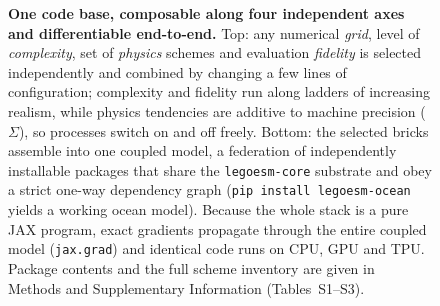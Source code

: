 \documentclass[11pt]{article}
\newcommand{\jaxgrad}{\texttt{jax.grad}}
\begin{document}
\begin{figure}[!htbp]
\caption{\textbf{One code base, composable along four independent axes and differentiable
end-to-end.} Top: any numerical \emph{grid}, level of \emph{complexity}, set of \emph{physics}
schemes and evaluation \emph{fidelity} is selected independently and combined by changing a few
lines of configuration; complexity and fidelity run along ladders of increasing realism, while
physics tendencies are additive to machine precision ($\Sigma$), so processes switch on and off
freely. Bottom: the selected bricks assemble into one coupled model, a federation of
independently installable packages that share the \texttt{legoesm-core} substrate and obey a
strict one-way dependency graph (\texttt{pip install legoesm-ocean} yields a working ocean model).
Because the whole stack is a pure JAX program, exact gradients propagate through the entire
coupled model (\jaxgrad) and identical code runs on CPU, GPU and TPU. Package contents and the
full scheme inventory are given in Methods and Supplementary Information (Tables~S1--S3).}
\label{fig:arch}
\end{figure}
\end{document}
